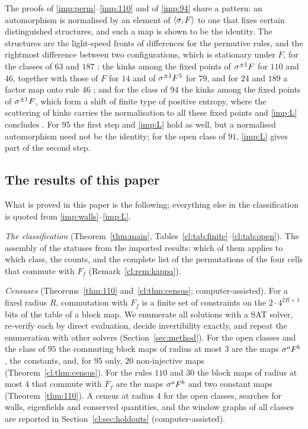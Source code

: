 The proofs of \eqref{imp:perm}--\eqref{imp:110} and of \eqref{imp:94} share a pattern: an automorphism is normalised by an element of $\langle\sigma,F\rangle$ to one that fixes certain distinguished structures, and such a map is shown to be the identity. The structures are the light-speed fronts of differences for the permutive rules, and the rightmost difference between two configurations, which is stationary under $F$, for the classes of $63$ and $187$ \cite{PaperB}; the kinks among the fixed points of $\sigma^{\pm1}F$ for $110$ and $46$, together with those of $F$ for $14$ and of $\sigma^{\pm1}F^3$ for $79$, and for $24$ and $189$ a factor map onto rule $46$ \cite{PaperA}; and for the class of $94$ the kinks among the fixed points of $\sigma^{\pm1}F$, which form a shift of finite type of positive entropy, where the scattering of kinks carries the normalisation to all these fixed points and \eqref{imp:L} concludes \cite{PaperE}. For $95$ the first step and \eqref{imp:L} hold as well, but a normalised automorphism need not be the identity; for the open class of $91$, \eqref{imp:L} gives part of the second step.

\subsection{The results of this paper}

What is proved in this paper is the following; everything else in the classification is quoted from \eqref{imp:walls}--\eqref{imp:L}.

\emph{The classification} (Theorem~\ref{thm:main}, Tables~\ref{cl:tab:finite}--\ref{cl:tab:open}). The assembly of the statuses from the imported results: which of them applies to which class, the counts, and the complete list of the permutations of the four cells that commute with $F_f$ (Remark~\ref{cl:rem:kappa}).

\emph{Censuses} (Theorems~\ref{thm:110} and~\ref{cl:thm:census}; computer-assisted). For a fixed radius $R$, commutation with $F_f$ is a finite set of constraints on the $2\cdot4^{2R+1}$ bits of the table of a block map. We enumerate all solutions with a SAT solver, re-verify each by direct evaluation, decide invertibility exactly, and repeat the enumeration with other solvers (Section~\ref{sec:method}). For the open classes and the class of $95$ the commuting block maps of radius at most $3$ are the maps $\sigma^aF^b$, the constants, and, for $95$ only, $20$ non-injective maps (Theorem~\ref{cl:thm:census}). For the rules $110$ and $30$ the block maps of radius at most $4$ that commute with $F_f$ are the maps $\sigma^aF^b$ and two constant maps (Theorem~\ref{thm:110}). A census at radius $4$ for the open classes, searches for walls, eigenfields and conserved quantities, and the window graphs of all classes are reported in Section~\ref{cl:sec:holdouts} (computer-assisted).

